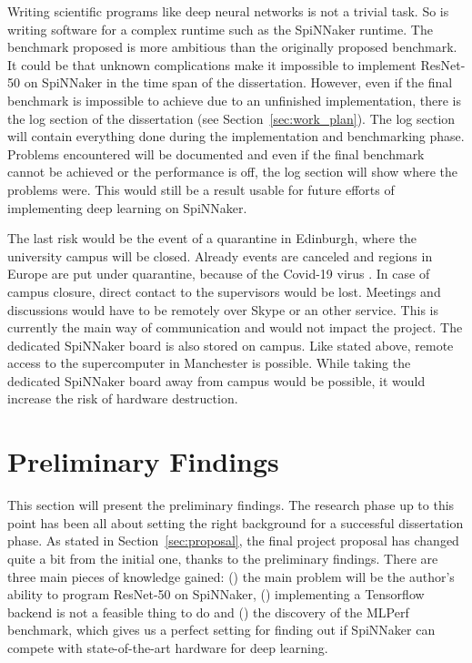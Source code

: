 \documentclass{article}
\begin{document}
Writing scientific programs like deep neural networks is
not a trivial task.
So is writing software for a complex runtime such as the
SpiNNaker runtime.
The benchmark proposed is more ambitious than the originally proposed
benchmark.
It could be that unknown complications make it impossible to
implement ResNet-50 on SpiNNaker in the time span of the dissertation.
However, even if the final benchmark is impossible to achieve
due to an unfinished implementation, there is the log
section of the dissertation (see Section~\ref{sec:work_plan}).
The log section will contain everything done during the
implementation and benchmarking phase.
Problems encountered will be documented and even if the
final benchmark cannot be achieved or the performance is
off, the log section will show where the problems were.
This would still be a result usable for future efforts of implementing
deep learning on SpiNNaker.

The last risk would be the event of a quarantine in Edinburgh,
where the university campus will be closed.
Already events are canceled and regions in Europe are put under
quarantine, because of the Covid-19 virus
\citep{borghese_et_al_2020}.
In case of campus closure, direct contact to the supervisors would be
lost.
Meetings and discussions would have to be remotely over Skype or an
other service.
This is currently the main way of communication and would not impact
the project.
The dedicated SpiNNaker board is also stored on campus.
Like stated above, remote access to the supercomputer in Manchester
is possible.
While taking the dedicated SpiNNaker board away from campus would be
possible, it would increase the risk of hardware destruction.


\section{Preliminary Findings} %
\label{sec:prelim}

This section will present the preliminary findings.
The research phase up to this point has been all about setting the
right background for a successful dissertation phase.
As stated in Section~\ref{sec:proposal}, the final
project proposal has changed quite a bit from the initial
one, thanks to the preliminary findings.
There are three main pieces of knowledge gained:
() the main problem will be the author's ability to
program ResNet-50 on SpiNNaker,
() implementing a Tensorflow backend is not a feasible
thing to do and () the discovery of the MLPerf
benchmark, which gives us a perfect setting for finding out if
SpiNNaker can compete with state-of-the-art hardware for
deep learning.
\end{document}

